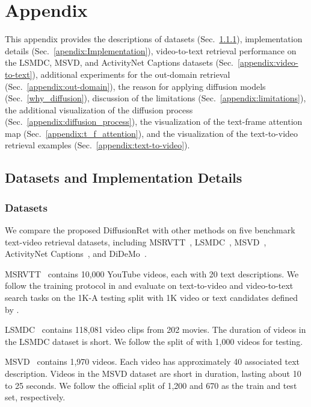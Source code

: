 \documentclass[10pt,twocolumn,letterpaper]{article}
\begin{document}
{\section{Appendix}
This appendix provides the descriptions of datasets (Sec.~\ref{apendix:dataset}), implementation details (Sec.~\ref{apendix:Implementation}), video-to-text retrieval performance on the LSMDC, MSVD, and ActivityNet Captions datasets (Sec.~\ref{appendix:video-to-text}), additional experiments for the out-domain retrieval (Sec.~\ref{appendix:out-domain}), the reason for applying diffusion models (Sec.~\ref{why_diffusion}), discussion of the limitations (Sec.~\ref{appendix:limitations}), the additional visualization of the diffusion process (Sec.~\ref{appendix:diffusion_process}), the visualization of the text-frame attention map (Sec.~\ref{appendix:t_f_attention}), and the visualization of the text-to-video retrieval examples (Sec.~\ref{appendix:text-to-video}).

\subsection{Datasets and Implementation Details}
\subsubsection{Datasets}\label{apendix:dataset}
We compare the proposed DiffusionRet with other methods on five benchmark text-video retrieval datasets, including MSRVTT~\cite{xu2016msr}, LSMDC~\cite{rohrbach2015a}, MSVD~\cite{chen2011collecting}, ActivityNet Captions~\cite{krishna2017dense}, and DiDeMo~\cite{anne2017localizing}. 

 MSRVTT~\cite{xu2016msr} contains 10,000 YouTube videos, each with 20 text descriptions. We follow the training protocol in \cite{liu2019use,gabeur2020multi,miech2019howto100m} and evaluate on text-to-video and video-to-text search tasks on the 1K-A testing split with 1K video or text candidates defined by \cite{yu2018a}.

 LSMDC~\cite{rohrbach2015a} contains 118,081 video clips from 202 movies. The duration of videos in the LSMDC dataset is short. We follow the split of \cite{gabeur2020multi} with 1,000 videos for testing. 

 MSVD~\cite{chen2011collecting} contains 1,970 videos. Each video has approximately 40 associated text description. Videos in the MSVD dataset are short in duration, lasting about 10 to 25 seconds. We follow the official split of 1,200 and 670 as the train and test set, respectively. 

}
\end{document}
